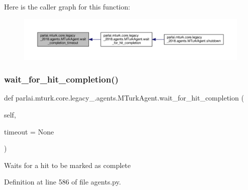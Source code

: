 Here is the caller graph for this function\+:
\nopagebreak
\begin{figure}[H]
\begin{center}
\leavevmode
\includegraphics[width=350pt]{classparlai_1_1mturk_1_1core_1_1legacy__2018_1_1agents_1_1MTurkAgent_af12ef4e56cea2b9800123c43227513d8_icgraph}
\end{center}
\end{figure}
\mbox{\label{classparlai_1_1mturk_1_1core_1_1legacy__2018_1_1agents_1_1MTurkAgent_a89e1e1c284db9228d61afb3f93247b12}} 
\subsubsection{\texorpdfstring{wait\+\_\+for\+\_\+hit\+\_\+completion()}{wait\_for\_hit\_completion()}}
{\footnotesize\ttfamily def parlai.\+mturk.\+core.\+legacy\+\_.\+agents.\+M\+Turk\+Agent.\+wait\+\_\+for\+\_\+hit\+\_\+completion (\begin{DoxyParamCaption}\item[{}]{self,  }\item[{}]{timeout = {\ttfamily None} }\end{DoxyParamCaption})}

\begin{DoxyVerb}Waits for a hit to be marked as complete\end{DoxyVerb}
 

Definition at line 586 of file agents.\+py.



